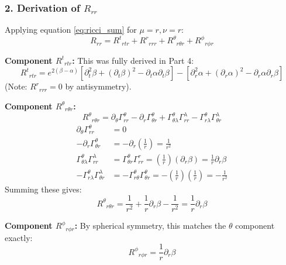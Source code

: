 \documentclass[11pt, a4paper]{report}
\begin{document}
\subsubsection*{2. Derivation of $R_{rr}$}

Applying equation \eqref{eq:ricci_sum} for $\mu=r, \nu=r$:
\begin{equation}
    R_{rr} = {R^t}_{rtr} + {R^r}_{rrr} + {R^\theta}_{r\theta r} + {R^\phi}_{r\phi r}
\end{equation}

\textbf{Component ${R^t}_{rtr}$:}
This was fully derived in Part 4:
\begin{equation}
    {R^t}_{rtr} = e^{2(\beta - \alpha)} \left[ \partial_t^2 \beta + (\partial_t \beta)^2 - \partial_t \alpha \partial_t \beta \right] - \left[ \partial_r^2 \alpha + (\partial_r \alpha)^2 - \partial_r \alpha \partial_r \beta \right]
\end{equation}
(Note: ${R^r}_{rrr} = 0$ by antisymmetry).

\textbf{Component ${R^\theta}_{r\theta r}$:}
\begin{equation}
    {R^\theta}_{r\theta r} = \partial_\theta \Gamma^\theta_{rr} - \partial_r \Gamma^\theta_{\theta r} + \Gamma^\theta_{\theta\lambda}\Gamma^\lambda_{rr} - \Gamma^\theta_{r\lambda}\Gamma^\lambda_{\theta r}
\end{equation}
\begin{align}
    \partial_\theta \Gamma^\theta_{rr} &= 0 \\
    -\partial_r \Gamma^\theta_{\theta r} &= -\partial_r \left( \frac{1}{r} \right) = \frac{1}{r^2} \\
    \Gamma^\theta_{\theta\lambda}\Gamma^\lambda_{rr} &= \Gamma^\theta_{\theta r}\Gamma^r_{rr} = \left(\frac{1}{r}\right) (\partial_r \beta) = \frac{1}{r} \partial_r \beta \\
    -\Gamma^\theta_{r\lambda}\Gamma^\lambda_{\theta r} &= -\Gamma^\theta_{r\theta}\Gamma^\theta_{\theta r} = -\left(\frac{1}{r}\right)\left(\frac{1}{r}\right) = -\frac{1}{r^2}
\end{align}
Summing these gives:
\begin{equation}
    {R^\theta}_{r\theta r} = \frac{1}{r^2} + \frac{1}{r} \partial_r \beta - \frac{1}{r^2} = \frac{1}{r} \partial_r \beta
\end{equation}

\textbf{Component ${R^\phi}_{r\phi r}$:}
By spherical symmetry, this matches the $\theta$ component exactly:
\begin{equation}
    {R^\phi}_{r\phi r} = \frac{1}{r} \partial_r \beta
\end{equation}
\end{document}
